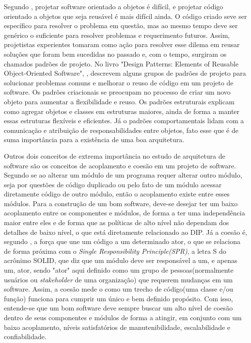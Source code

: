 \documentclass[12pt, %
openright, 
oneside, %
a4paper,    %
brazil]{facom-ufu-abntex2}
\begin{document}
Segundo , projetar software orientado a objetos é difícil, e projetar código orientado a objetos que seja reusável é mais difícil ainda. O código criado seve ser específico para resolver o problema em questão, mas ao mesmo tempo deve ser genérico o suficiente para resolver problemas e requerimento futuros. Assim, projetistas experientes tomaram como ação para resolver esse dilema em reusar soluções que foram bem sucedidas no passado e, com o tempo, surgiram os chamados padrões de projeto. No livro "Design Patterns: Elements of Reusable Object-Oriented Software", , descrevem alguns grupos de padrões de projeto para solucionar problemas comuns e melhorar o reuso de código em um projeto de software. Os padrões criacionais se preocupam no processo de criar um novo objeto para aumentar a flexibilidade e reuso. Os padrões estruturais explicam como agregar objetos e classes em estruturas maiores, ainda de forma a manter essas estruturas flexíveis e eficientes. Já o padrões comportamentais lidam com a comunicação e atribuição de responsabilidades entre objetos, fato esse que é de suma importância para a existência de uma boa arquitetura.

Outros dois conceitos de extrema importância no estudo de arquitetura de software são os conceitos de acoplamento e coesão em um projeto de software. Segundo  se ao alterar um módulo de um programa requer alterar outro módulo, seja por questões de código duplicado ou pelo fato de um módulo acessar diretamente código de outro módulo, então o acoplamento existe entre esses módulos. Para a construção de um bom software, deve-se desejar ter um baixo acoplamento entre os componentes e módulos, de forma a ter uma independência maior entre eles e de forma que as políticas de alto nível não dependam dos detalhes de baixo nível, o que está diretamente relacionado ao DIP. Já a coesão é, segundo , a força que une um código a um determinado ator, o que se relaciona de forma próxima com o \textit{Single Responsibility Principle(SPR)}, a letra S do acrônimo SOLID, que diz que um módulo deve ser responsável a um, e apenas um, ator, sendo "ator" aqui definido como um grupo de pessoas(normalmente usuários ou \textit{stakeholder} de uma organização) que requerem mudanças em um software. Assim, a coesão mede o como um trecho de código(uma classe e/ou função) funciona para cumprir um único e bem definido propósito. Com isso, entende-se que um bom software deve sempre buscar um alto nível de coesão dentro de seus componentes e módulos de forma a atingir, em conjunto com um baixo acoplamento, níveis satisfatórios de manutenibilidade, escalabilidade e confiabilidade.
\end{document}
